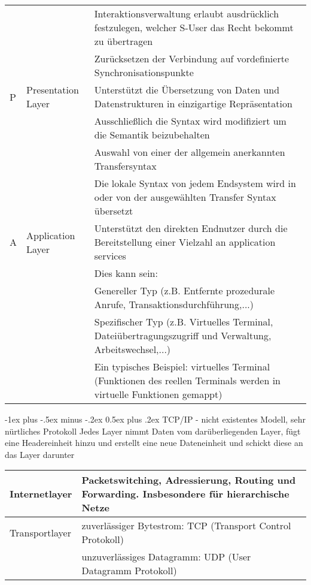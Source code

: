 \documentclass[10pt,landscape]{article}
\makeatletter
\renewcommand{\section}{\@startsection{section}{1}{0mm}%
                                {-1ex plus -.5ex minus -.2ex}%
                                {0.5ex plus .2ex}%
                                {\normalfont\large\bfseries}}
\makeatother
\begin{document}
\begin{tabular}{l | l | l}
        &&Interaktionsverwaltung erlaubt ausdrücklich festzulegen, welcher S-User das Recht bekommt zu übertragen\\
        &&Zurücksetzen der Verbindung auf vordefinierte Synchronisationspunkte\\
        \hline
    P & Presentation Layer &
        Unterstützt die Übersetzung von Daten und Datenstrukturen in einzigartige Repräsentation\\
        &&Ausschließlich die Syntax wird modifiziert um die Semantik beizubehalten\\
        &&Auswahl von einer der allgemein anerkannten Transfersyntax\\
        &&Die lokale Syntax von jedem Endsystem wird in oder von der ausgewählten Transfer Syntax übersetzt\\
        \hline
    A & Application Layer &
        Unterstützt den direkten Endnutzer durch die Bereitstellung einer Vielzahl an application services\\
        &&Dies kann sein:\\
        &&Genereller Typ (z.B. Entfernte prozedurale Anrufe, Transaktionsdurchführung,...)\\
        &&Spezifischer Typ (z.B. Virtuelles Terminal, Dateiübertragungszugriff und Verwaltung, Arbeitswechsel,...)\\
        &&Ein typisches Beispiel: virtuelles Terminal (Funktionen des reellen Terminals werden in virtuelle Funktionen gemappt)\\

\end{tabular}

\section{TCP/IP - nicht existentes Modell, sehr nürtliches Protokoll}
Jedes Layer nimmt Daten vom darüberliegenden Layer, fügt eine Headereinheit hinzu und erstellt eine neue Dateneinheit und schickt diese an das Layer darunter
\begin{tabular}{l | l}
    Internetlayer & Packetswitching, Adressierung, Routing und Forwarding. Insbesondere für hierarchische Netze \\
    \hline
    Transportlayer & zuverlässiger Bytestrom: TCP (Transport Control Protokoll) \\
        & unzuverlässiges Datagramm: UDP (User Datagramm Protokoll)\\
\end{tabular}
\end{document}
